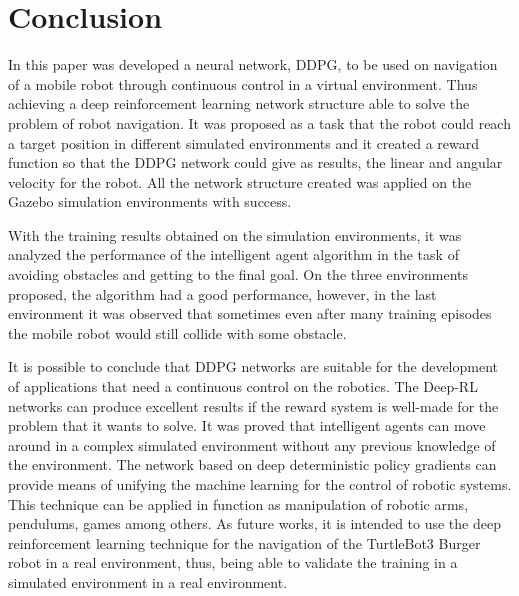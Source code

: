 \section*{Conclusion}

In this paper was developed a neural network, DDPG, to be used on navigation of a mobile robot through continuous control in a virtual environment.
Thus achieving a deep reinforcement learning network structure able to solve the problem of robot navigation.
It was proposed as a task that the robot could reach a target position in different simulated environments and it created a reward function so that the DDPG network could give as results, the linear and angular velocity for the robot. All the network structure created was applied on the Gazebo simulation environments with success.

With the training results obtained on the simulation environments, it was analyzed the performance of the intelligent agent algorithm in the task of avoiding obstacles and getting to the final goal. 
On the three environments proposed, the algorithm had a good performance, however, in the last environment it was observed that sometimes even after many training episodes the mobile robot would still collide with some obstacle.

It is possible to conclude that DDPG networks are suitable for the development of applications that need a continuous control on the robotics.
The Deep-RL networks can produce excellent results if the reward system is well-made for the problem that it wants to solve.
It was proved that intelligent agents can move around in a complex simulated environment without any previous knowledge of the environment.
The network based on deep deterministic policy gradients can provide means of unifying the machine learning for the control of robotic systems.
This technique can be applied in function as manipulation of robotic arms, pendulums, games among others.
As future works, it is intended to use the deep reinforcement learning technique for the navigation of the TurtleBot3 Burger robot in a real environment, thus, being able to validate the training in a simulated environment in a real environment.